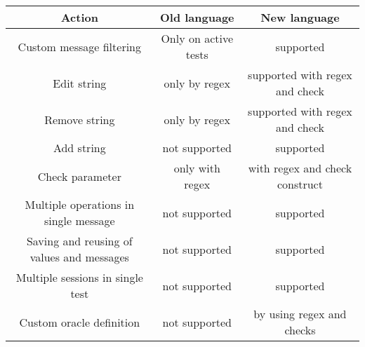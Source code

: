 \begin{center}
    \begin{tabular}{|c|c|c|}
        \hline
        Action                                    & Old language         & New language                             \\
        \hline\hline
        Custom message filtering                  & Only on active tests & supported                                \\
        Edit string                               & only by regex        & supported with regex and check \\
        Remove string                             & only by regex        & supported with regex and check\\
        Add string                                & not supported        & supported                                \\
        Check parameter                           & only with regex      & with regex and check construct           \\
        Multiple operations in single message     & not supported        & supported                                \\
        Saving and reusing of values and messages & not supported        & supported                                \\
        Multiple sessions in single test          & not supported        & supported                                \\
        Custom oracle definition                  & not supported        & by using regex and checks                \\
        \hline
    \end{tabular}
\end{center}





